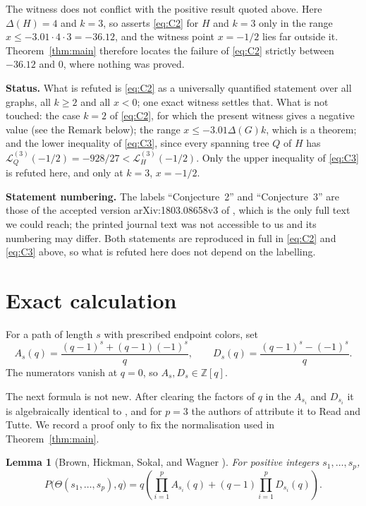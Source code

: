 \documentclass[11pt]{amsart}
\newtheorem{lemma}[theorem]{Lemma}
\theoremstyle{remark}
\newcommand{\Lfun}{\mathcal L}
\newcommand{\ThetaG}{\Theta}
\begin{document}
The witness does not conflict with the positive result quoted above. Here
$\Delta(H)=4$ and $k=3$, so \cite[Theorem~1.5]{NingYang} asserts
\eqref{eq:C2} for $H$ and $k=3$ only in the range
$x\le-3.01\cdot4\cdot3=-36.12$, and the witness point $x=-1/2$ lies far
outside it. Theorem~\ref{thm:main} therefore locates the failure of
\eqref{eq:C2} strictly between $-36.12$ and $0$, where nothing was proved.

\medskip
\noindent\textbf{Status.}
What is refuted is \eqref{eq:C2} as a universally quantified statement over
all graphs, all $k\ge2$ and all $x<0$; one exact witness settles that. What is
not touched: the case $k=2$ of \eqref{eq:C2}, for which the present witness
gives a negative value (see the Remark below); the range
$x\le-3.01\Delta(G)k$, which is a theorem; and the lower inequality of
\eqref{eq:C3}, since every spanning tree $Q$ of $H$ has
$\Lfun_Q^{(3)}(-1/2)=-928/27<\Lfun_H^{(3)}(-1/2)$. Only the upper inequality
of \eqref{eq:C3} is refuted here, and only at $k=3$, $x=-1/2$.

\medskip
\noindent\textbf{Statement numbering.}
The labels ``Conjecture~2'' and ``Conjecture~3'' are those of the accepted
version arXiv:1803.08658v3 of \cite{DongEtAl}, which is the only full text we
could reach; the printed journal text was not accessible to us and its
numbering may differ. Both statements are reproduced in full in
\eqref{eq:C2} and \eqref{eq:C3} above, so what is refuted here does not depend
on the labelling.

\section{Exact calculation}

For a path of length $s$ with prescribed endpoint colors, set
\[
 A_s(q)=\frac{(q-1)^s+(q-1)(-1)^s}{q},
 \qquad
 D_s(q)=\frac{(q-1)^s-(-1)^s}{q}.
\]
The numerators vanish at $q=0$, so $A_s,D_s\in\mathbb Z[q]$.

The next formula is not new. After clearing the factors of $q$ in the
$A_{s_i}$ and $D_{s_i}$ it is algebraically identical to
\cite[eq.~(2.6a)]{BHSW}, and for $p=3$ the authors of \cite{BHSW} attribute it
to Read and Tutte. We record a proof only to fix the normalisation used in
Theorem~\ref{thm:main}.

\begin{lemma}[Brown, Hickman, Sokal, and Wagner \cite{BHSW}]\label{lem:theta}
For positive integers $s_1,\ldots,s_p$,
\begin{equation}\label{eq:theta}
 P\bigl(\ThetaG(s_1,\ldots,s_p),q\bigr)
 =q\left(
   \prod_{i=1}^p A_{s_i}(q)
   +(q-1)\prod_{i=1}^p D_{s_i}(q)
 \right).
\end{equation}
\end{lemma}
\end{document}
